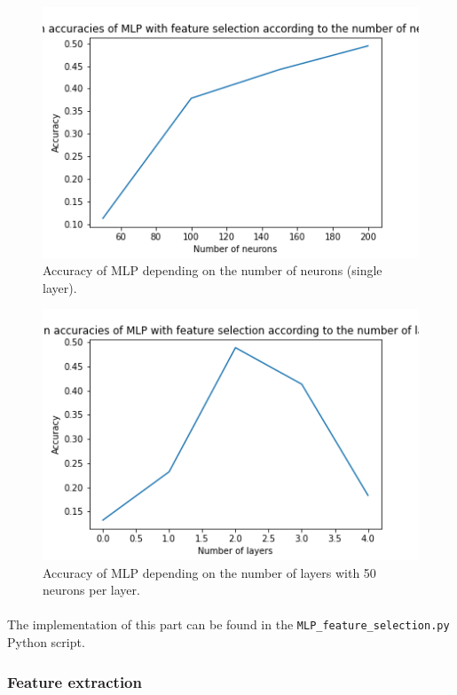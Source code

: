 \documentclass[a4paper, 11pt, oneside]{article}
\begin{document}
\begin{figure}[H]
\centering
\includegraphics[scale=0.4]{mlp/MLP_feature_selection_neurons.png}
\caption{Accuracy of MLP depending on the number of neurons (single layer).}
\label{fig:mlp-feature-selection-neurons}
\end{figure}

\begin{figure}[H]
\centering
\includegraphics[scale=0.4]{mlp/MLP_feature_selection_layers.png}
\caption{Accuracy of MLP depending on the number of layers with 50 neurons per layer.}
\label{fig:mlp-feature-selection-layers}
\end{figure}

\paragraph{}The implementation of this part can be found in the \texttt{MLP\_feature\_selection.py} Python script.

\subsubsection{Feature extraction} \label{subsubsec:mlp-feature-extraction}
\end{document}
